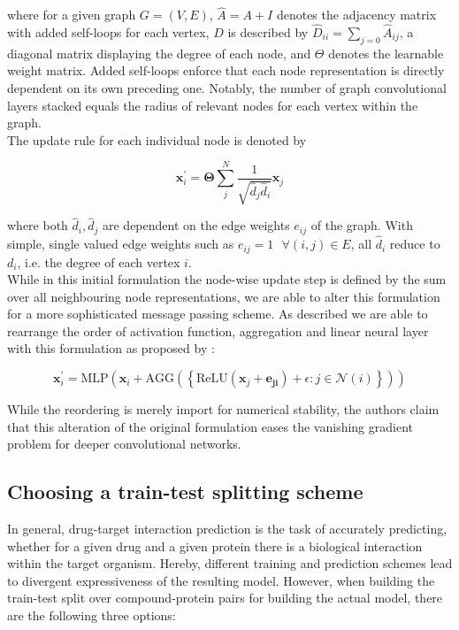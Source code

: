 \documentclass{bioinfo}
\begin{document}
where for a given graph $G=(V,E)$, $\hat{A} = A + I$ denotes the adjacency matrix with added self-loops for each vertex, $D$ is described by $\hat{D}_{ii} = \sum_{j=0} \hat{A}_{ij}$, a diagonal matrix displaying the degree of each node, and $\Theta$ denotes the learnable weight matrix. Added self-loops enforce that each node representation is directly dependent on its own preceding one. Notably, the number of graph convolutional layers stacked equals the radius of relevant nodes for each vertex within the graph.\\

The update rule for each individual node is denoted by 

\begin{equation}
	\mathbf{x}^{\prime}_i = \mathbf{\Theta} \sum^{N}_{j}
	\frac{1}{\sqrt{\hat{d}_j \hat{d}_i}} \mathbf{x}_j
\end{equation}

where both $\hat{d}_i, \hat{d}_j$ are dependent on the edge weights $e_{ij}$ of the graph. With simple, single valued edge weights such as $e_{ij}=1 \text{ }\forall (i,j)\in E$, all $\hat{d}_i$ reduce to $d_i$, i.e. the degree of each vertex $i$. \\

While in this initial formulation the node-wise update step is defined by the sum over all neighbouring node representations, we are able to alter this formulation for a more sophisticated message passing scheme. As described we are able to rearrange the order of activation function, aggregation and linear neural layer with this formulation as proposed by \citet{GENConv2020}:

\begin{equation}
	\mathbf{x}_i^{\prime} = \mathrm{MLP} \left( \mathbf{x}_i +
	\mathrm{AGG} \left( \left\{
	\mathrm{ReLU} \left( \mathbf{x}_j + \mathbf{e_{ji}} \right) +\epsilon
	: j \in \mathcal{N}(i) \right\} \right)
	\right)
\end{equation}

While the reordering is merely import for numerical stability, the authors claim that this alteration of the original formulation eases the vanishing gradient problem for deeper convolutional networks. \\




\subsection{Choosing a train-test splitting scheme}
In general, drug-target interaction prediction is the task of accurately predicting, whether for a given drug and a given protein there is a biological interaction within the target organism. Hereby, different training and prediction schemes lead to divergent expressiveness of the resulting model. However, when building the train-test split over compound-protein pairs for building the actual model, there are the following three options:
\end{document}
